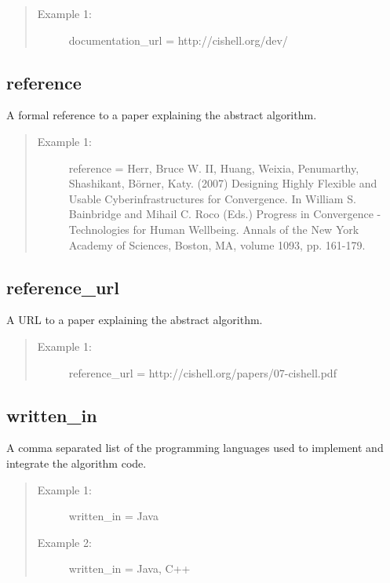 \begin{quote}
\begin{description}
  \item[Example 1:] documentation\_url = http://cishell.org/dev/ 
\end{description}
\end{quote}


\subsection*{reference}
A formal reference to a paper explaining the abstract algorithm.

\begin{quote}
\begin{description}
  \item[Example 1:] reference = Herr, Bruce W. II, Huang, Weixia, Penumarthy,
  Shashikant, B\"{o}rner, Katy. (2007) Designing Highly Flexible and Usable 
  Cyberinfrastructures for Convergence. In William S. Bainbridge and Mihail C. 
  Roco (Eds.) Progress in Convergence - Technologies for Human Wellbeing. 
  Annals of the New York Academy of Sciences, Boston, MA, volume 1093, pp. 161-179.
\end{description}
\end{quote}


\subsection*{reference\_url}
A URL to a paper explaining the abstract algorithm.

\begin{quote}
\begin{description}
  \item[Example 1:] reference\_url = http://cishell.org/papers/07-cishell.pdf 
\end{description}
\end{quote}


\subsection*{written\_in}
A comma separated list of the programming languages used to implement and
integrate the algorithm code.

\begin{quote}
\begin{description}
  \item[Example 1:] written\_in = Java
  \item[Example 2:] written\_in = Java, C++ 
\end{description}
\end{quote}
